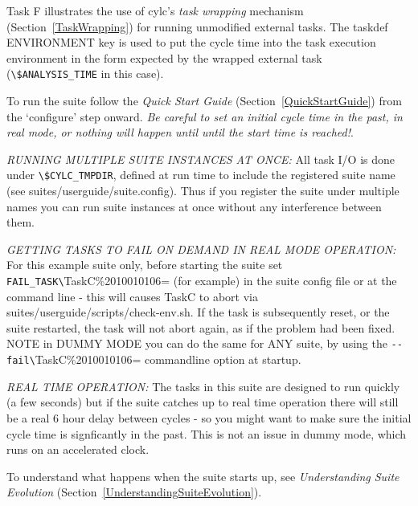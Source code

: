 Task F illustrates the use of cylc's {\em task wrapping} mechanism
(Section~\ref{TaskWrapping}) for running unmodified external tasks. 
The taskdef ENVIRONMENT key is used to put the cycle time
into the task execution environment in the form expected by the wrapped
external task (\lstinline=\$ANALYSIS_TIME= in this case). 

To run the suite follow the {\em Quick Start Guide}
(Section~\ref{QuickStartGuide}) from the `configure' step onward. 
{\em Be careful to set an initial cycle time in the past, in real mode,
or nothing will happen until until the start time is reached!}.

{\em RUNNING MULTIPLE SUITE INSTANCES AT ONCE:} All task I/O is done
under \lstinline=\$CYLC_TMPDIR=, defined at run time to include the
registered suite name (see suites/userguide/suite.config).  Thus if
you register the suite under multiple names you can run suite instances
at once without any interference between them.          

{\em GETTING TASKS TO FAIL ON DEMAND IN REAL MODE OPERATION:} For this
example suite only, before starting the suite set
\lstinline=FAIL_TASK\=TaskC\%2010010106= (for example) in the suite config
file or at the command line - this will causes TaskC to abort via
suites/userguide/scripts/check-env.sh.  If the task is subsequently
reset, or the suite restarted, the task will not abort again, as if the
problem had been fixed. NOTE in DUMMY MODE you can do the same for ANY
suite, by using the \lstinline=--fail\=TaskC\%2010010106= commandline
option at startup.                

{\em REAL TIME OPERATION:} The tasks in this suite are designed to run
quickly (a few seconds) but if the suite catches up to real time
operation there will still be a real 6 hour delay between cycles - so
you might want to make sure the initial cycle time is signficantly in
the past. This is not an issue in dummy mode, which runs on an
accelerated clock.       

To understand what happens when the suite starts up, see {\em
Understanding Suite Evolution}
(Section~\ref{UnderstandingSuiteEvolution}).
